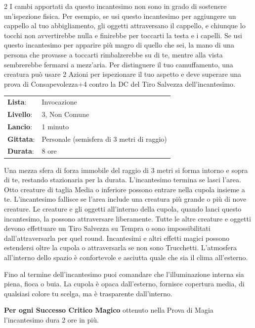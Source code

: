 \begin{multicols}{2}
I cambi apportati da questo incantesimo non sono in grado di sostenere un'ispezione fisica. Per esempio, se usi questo incantesimo per aggiungere un cappello al tuo abbigliamento, gli oggetti attraversano il cappello, e chiunque lo tocchi non avvertirebbe nulla e finirebbe per toccarti la testa e i capelli. Se usi questo incantesimo per apparire più magro di quello che sei, la mano di una persona che provasse a toccarti rimbalzerebbe su di te, mentre alla vista sembrerebbe fermarsi a mezz'aria. Per distinguere il tuo camuffamento, una creatura può usare 2 Azioni per ispezionare il tuo aspetto e deve superare una prova di Consapevolezza+4 contro la DC del Tiro Salvezza dell'incantesimo.

\noindent\begin{tabularx}{\linewidth}{p{1.9cm}X}
	\rowcolor{gray!20}\textbf{Lista}: & Invocazione \\
	\textbf{Livello}: & 3, Non Comune \\
	\rowcolor{gray!20}\textbf{Lancio}: & 1 minuto \\
	\textbf{Gittata}: & Personale (semisfera di 3 metri di raggio) \\
	\rowcolor{gray!20}\textbf{Durata}: & 8 ore \\
\end{tabularx}\smallskip

Una mezza sfera di forza immobile del raggio di 3 metri si forma intorno e sopra di te, restando stazionaria per la durata. L'incantesimo termina se lasci l'area. Otto creature di taglia Media o inferiore possono entrare nella cupola insieme a te. L'incantesimo fallisce se l'area include una creatura più grande o più di nove creature. Le creature e gli oggetti all'interno della cupola, quando lanci questo incantesimo, la possono attraversare liberamente. Tutte le altre creature e oggetti devono effettuare un Tiro Salvezza su Tempra o sono impossibilitati dall'attraversarla per quel round. Incantesimi e altri effetti magici possono estendersi oltre la cupola o attraversarla se non sono Trucchetti. L'atmosfera all'interno dello spazio è confortevole e asciutta quale che sia il clima all'esterno.

Fino al termine dell'incantesimo puoi comandare che l'illuminazione interna sia piena, fioca o buia. La cupola è opaca dall'esterno, fornisce copertura media, di qualsiasi colore tu scelga, ma è trasparente dall'interno.

\textbf{Per ogni Successo Critico Magico} ottenuto nella Prova di Magia l'incantesimo dura 2 ore in più.


\end{multicols}
